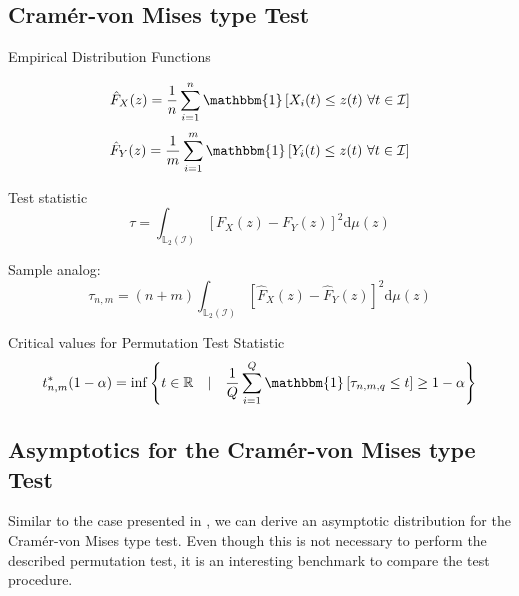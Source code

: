 \documentclass[12pt, a4paper]{article}
\theoremstyle{MAstyle} \newtheorem{assumption}{Assumption}[section]
\theoremstyle{MAstyle} \newtheorem{definition}{Definition}[section]
\begin{document}
		\subsection{Cram\'{e}r-von Mises type Test}
		
			Empirical Distribution Functions
			\begin{multicols}{2}
				\noindent
				\begin{equation*}
					\hat{F}_X(z) = \frac{1}{n} \sum_{i = 1}^{n}\mathbbm{1}\left[X_i(t) \leq z(t) \ \forall t \in \mathcal{I}\right]
				\end{equation*}
				\begin{equation}
					\hat{F}_Y(z) = \frac{1}{m} \sum_{i = 1}^{m}\mathbbm{1}\left[Y_i(t) \leq z(t) \ \forall t \in \mathcal{I}\right]
				\end{equation}
			\end{multicols}
			
			
			Test statistic
			\begin{equation}
				\tau = \int_{\mathbb{L}_2(\mathcal{I})}\left[F_X(z) - F_Y(z)\right]^2 \mathrm{d} \mu(z)
			\end{equation}
			
			Sample analog:
			\begin{equation}
				\tau_{n,m} = (n+m) \int_{\mathbb{L}_2(\mathcal{I})}\left[\hat{F}_X(z) - \hat{F}_Y(z)\right]^2 \mathrm{d} \mu(z)
			\end{equation}
		
			Critical values for Permutation Test Statistic
			\begin{equation}
				t^{*}_{n,m}(1-\alpha) = \inf \left\{t \in \mathbb{R} \quad \vert \quad \frac{1}{Q} \sum_{i = 1}^{Q} \mathbbm{1}\left[\tau_{n,m,q} \leq t\right] \geq 1 - \alpha \right\}
			\end{equation}
		
		\subsection{Asymptotics for the Cram\'{e}r-von Mises type Test}
			Similar to the case presented in \cite{bugni_goodness--fit_2009}, we can derive an asymptotic distribution for the Cram\'{e}r-von Mises type test. Even though this is not necessary to perform the described permutation test, it is an interesting benchmark to compare the test procedure.
		
\end{document}

